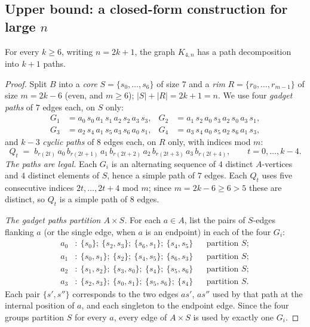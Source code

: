 \subsection{Upper bound: a closed-form construction for large \texorpdfstring{$n$}{n}}

\begin{proposition}\label{prop:k4large}
For every $k\ge6$, writing $n=2k+1$, the graph $K_{4,n}$ has a path decomposition into $k+1$
paths.
\end{proposition}

\begin{proof}
Split $B$ into a \emph{core} $S=\{s_0,\dots,s_6\}$ of size $7$ and a \emph{rim}
$R=\{r_0,\dots,r_{m-1}\}$ of size $m=2k-6$ (even, and $m\ge6$); $|S|+|R|=2k+1=n$. We use four
\emph{gadget paths} of $7$ edges each, on $S$ only:
\begin{align*}
G_1&=a_0\,s_0\,a_1\,s_1\,a_2\,s_2\,a_3\,s_3, &
G_2&=a_1\,s_2\,a_0\,s_3\,a_2\,s_0\,a_3\,s_1,\\
G_3&=a_2\,s_4\,a_1\,s_5\,a_3\,s_6\,a_0\,s_1, &
G_4&=a_3\,s_4\,a_0\,s_5\,a_2\,s_6\,a_1\,s_3,
\end{align*}
and $k-3$ \emph{cyclic paths} of $8$ edges each, on $R$ only, with indices mod $m$:
\[
Q_t \;=\; b_{r(2t)}\,a_0\,b_{r(2t+1)}\,a_1\,b_{r(2t+2)}\,a_2\,b_{r(2t+3)}\,a_3\,b_{r(2t+4)},
\qquad t=0,\dots,k-4 .
\]
\emph{The paths are legal.} Each $G_i$ is an alternating sequence of $4$ distinct $A$-vertices
and $4$ distinct elements of $S$, hence a simple path of $7$ edges. Each $Q_t$ uses five
consecutive indices $2t,\dots,2t+4$ mod $m$; since $m=2k-6\ge6>5$ these are distinct, so $Q_t$
is a simple path of $8$ edges.

\emph{The gadget paths partition $A\times S$.}
For each $a\in A$, list the pairs of $S$-edges flanking $a$ (or the single edge, when $a$ is an
endpoint) in each of the four $G_i$:
\begin{align*}
a_0&:\ \{s_0\};\ \{s_2,s_3\};\ \{s_6,s_1\};\ \{s_4,s_5\} &
&\text{partition } S;\\
a_1&:\ \{s_0,s_1\};\ \{s_2\};\ \{s_4,s_5\};\ \{s_6,s_3\} &&
\text{partition } S;\\
a_2&:\ \{s_1,s_2\};\ \{s_3,s_0\};\ \{s_4\};\ \{s_5,s_6\} &&
\text{partition } S;\\
a_3&:\ \{s_2,s_3\};\ \{s_0,s_1\};\ \{s_5,s_6\};\ \{s_4\} &&
\text{partition } S.
\end{align*}
Each pair $\{s',s''\}$ corresponds to the two edges $as'$, $as''$ used by that path at the
internal position of $a$, and each singleton to the endpoint edge. Since the four groups
partition $S$ for every $a$, every edge of $A\times S$ is used by exactly one $G_i$.


\end{proof}
